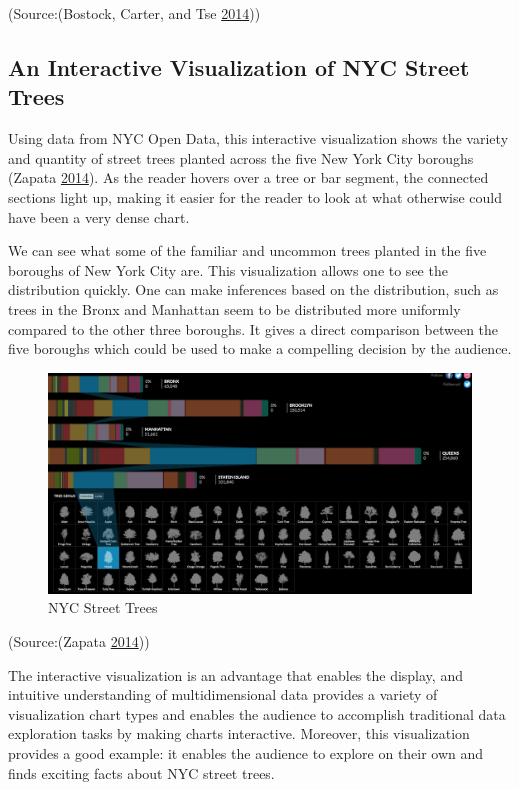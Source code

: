 \documentclass[]{book}
\theoremstyle{definition}
\theoremstyle{definition}
\theoremstyle{definition}
\theoremstyle{remark}
\begin{document}
(Source:(Bostock, Carter, and Tse
\protect\hyperlink{ref-rent_or_buy}{2014}))

\subsection{An Interactive Visualization of NYC Street
Trees}\label{an-interactive-visualization-of-nyc-street-trees}

Using data from NYC Open Data, this interactive visualization shows the
variety and quantity of street trees planted across the five New York
City boroughs (Zapata \protect\hyperlink{ref-trees}{2014}). As the
reader hovers over a tree or bar segment, the connected sections light
up, making it easier for the reader to look at what otherwise could have
been a very dense chart.

We can see what some of the familiar and uncommon trees planted in the
five boroughs of New York City are. This visualization allows one to see
the distribution quickly. One can make inferences based on the
distribution, such as trees in the Bronx and Manhattan seem to be
distributed more uniformly compared to the other three boroughs. It
gives a direct comparison between the five boroughs which could be used
to make a compelling decision by the audience.

\begin{figure}
\centering
\includegraphics{images/NY_trees.png}
\caption{NYC Street Trees}
\end{figure}

(Source:(Zapata \protect\hyperlink{ref-trees}{2014}))

The interactive visualization is an advantage that enables the display,
and intuitive understanding of multidimensional data provides a variety
of visualization chart types and enables the audience to accomplish
traditional data exploration tasks by making charts interactive.
Moreover, this visualization provides a good example: it enables the
audience to explore on their own and finds exciting facts about NYC
street trees.
\end{document}
